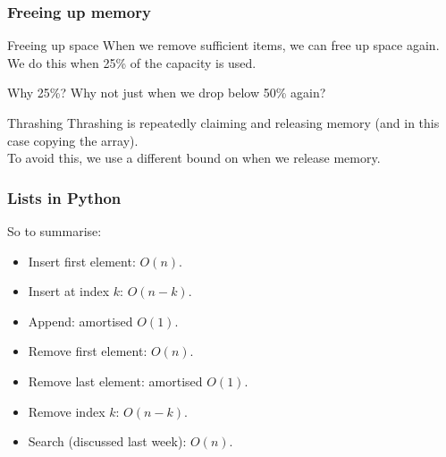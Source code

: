 \begin{frame}
	\frametitle{Freeing up memory}
	\begin{block}{Freeing up space}
		When we remove sufficient items, we can free up space again.\\
		We do this when 25\% of the capacity is used.
	\end{block}	
	\pause
	\begin{questionblock}{Why 25\%?}
		Why not just when we drop below 50\% again?
	\end{questionblock}
	\pause
	\begin{answerblock}{Thrashing}
		Thrashing is repeatedly claiming and releasing memory (and in this case copying the array).\\
		To avoid this, we use a different bound on when we release memory.
	\end{answerblock}
\end{frame}

\begin{frame}
	\frametitle{Lists in Python}
	So to summarise:
	\begin{itemize}
		\item Insert first element: $O(n)$.
		\item Insert at index $k$: $O(n-k)$.
		\item Append: amortised $O(1)$.
		\item Remove first element: $O(n)$.
		\item Remove last element: amortised $O(1)$.
		\item Remove index $k$: $O(n-k)$.
		\item Search (discussed last week): $O(n)$.
	\end{itemize}
\end{frame}
